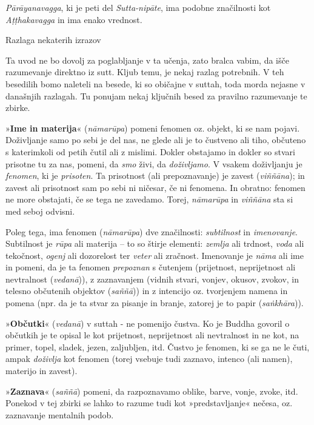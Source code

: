 \emph{Pārāyanavagga}, ki je peti del \emph{Sutta-nipāte}, ima podobne
značilnosti kot \emph{Aṭṭhakavagga} in ima enako vrednost.

Razlaga nekaterih izrazov

Ta uvod ne bo dovolj za poglabljanje v ta učenja, zato bralca vabim, da
išče razumevanje direktno iz sutt. Kljub temu, je nekaj razlag
potrebnih. V teh besedilih bomo naleteli na besede, ki so običajne v
suttah, toda morda nejasne v današnjih razlagah. Tu ponujam nekaj
ključnih besed za pravilno razumevanje te zbirke.

»\textbf{Ime in materija}« (\emph{nāmarūpa}) pomeni fenomen oz. objekt,
ki se nam pojavi. Doživljanje samo po sebi je del nas, ne glede ali je
to čustveno ali tiho, občuteno s katerimkoli od petih čutil ali z
mislimi. Dokler obstajamo in dokler so stvari prisotne tu za nas,
pomeni, da \emph{smo} živi, da \emph{doživljamo}. V vsakem doživljanju
je \emph{fenomen}, ki je \emph{prisoten}. Ta prisotnost (ali
prepoznavanje) je zavest (\emph{viññāna}); in zavest ali prisotnost sam
po sebi ni ničesar, če ni fenomena. In obratno: fenomen ne more
obstajati, če se tega ne zavedamo. Torej, \emph{nāmarūpa} in
\emph{viññāna} sta si med seboj odvisni.

Poleg tega, ima fenomen (\emph{nāmarūpa}) dve značilnosti:
\emph{subtilnost} in \emph{imenovanje}. Subtilnost je \emph{rūpa} ali
materija -- to so štirje elementi: \emph{zemlja} ali trdnost,
\emph{voda} ali tekočnost, \emph{ogenj} ali dozorelost ter \emph{veter}
ali zračnost. Imenovanje je \emph{nāma} ali ime in pomeni, da je ta
fenomen \emph{prepoznan} s čutenjem (prijetnost, neprijetnost ali
nevtralnost (\emph{vedanā})), z zaznavanjem (vidnih stvari, vonjev,
okusov, zvokov, in telesno občutenih objektov (\emph{saññā})) in z
intencijo oz. tvorjenjem namena in pomena (npr. da je ta stvar za
pisanje in branje, zatorej je to papir (\emph{saṅkhāra})).

»\textbf{Občutki}« (\emph{vedanā}) v suttah - ne pomenijo čustva. Ko je
Buddha govoril o občutkih je te opisal le kot prijetnost, neprijetnost
ali nevtralnost in ne kot, na primer, topel, sladek, jezen, zaljubljen,
itd. Čustvo je fenomen, ki se ga ne le čuti, ampak \emph{doživlja} kot
fenomen (torej vsebuje tudi zaznavo, intenco (ali namen), materijo in
zavest).

»\textbf{Zaznava}« (\emph{saññā}) pomeni, da razpoznavamo oblike, barve,
vonje, zvoke, itd. Ponekod v tej zbirki se lahko to razume tudi kot
»predstavljanje« nečesa, oz. zaznavanje mentalnih podob.

